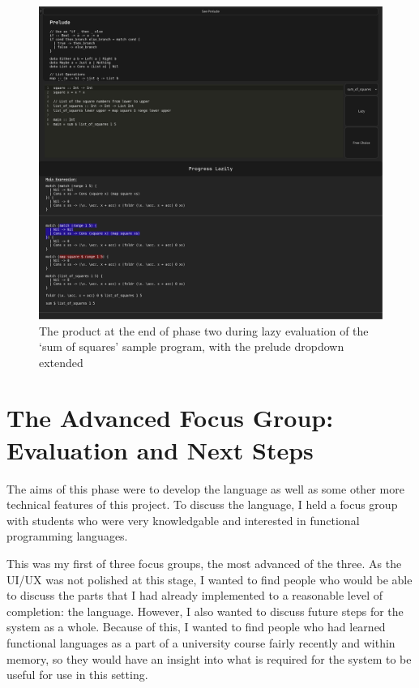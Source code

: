 \begin{figure}[h]
    \centering
    \includegraphics[width=1\linewidth]{images/phase-2-end2.png} 
    \captionsetup{justification=centering}
    \caption{The product at the end of phase two during lazy evaluation of the `sum of squares' sample program, with the prelude dropdown extended}
    \label{fig:screenshot_c2_end}
\end{figure}

\section{The Advanced Focus Group: Evaluation and Next Steps}
\label{ref:afg_figma}
\label{ref:afg}
The aims of this phase were to develop the language as well as some other more technical features of this project. To discuss the language, I held a focus group with students who were very knowledgable and interested in functional programming languages. 

This was my first of three focus groups, the most advanced of the three. As the UI/UX was not polished at this stage, I wanted to find people who would be able to discuss the parts that I had already implemented to a reasonable level of completion: the language. However, I also wanted to discuss future steps for the system as a whole. Because of this, I wanted to find people who had learned functional languages as a part of a university course fairly recently and within memory, so they would have an insight into what is required for the system to be useful for use in this setting. 

